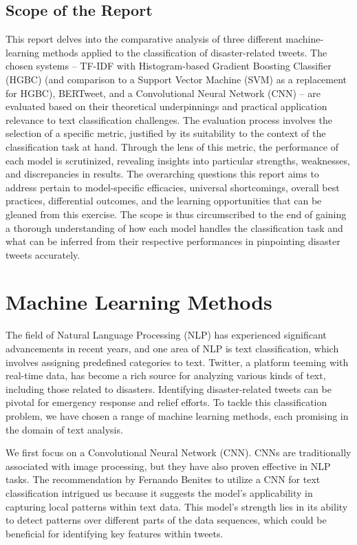 \documentclass[10pt,table]{article}
\begin{document}
\subsection{Scope of the Report}
This report delves into the comparative analysis of three different machine-learning methods applied to the classification of disaster-related tweets. The chosen systems – TF-IDF with Histogram-based Gradient Boosting Classifier (HGBC) (and comparison to a Support Vector Machine (SVM) as a replacement for HGBC), BERTweet, and a Convolutional Neural Network (CNN) – are evaluated based on their theoretical underpinnings and practical application relevance to text classification challenges. The evaluation process involves the selection of a specific metric, justified by its suitability to the context of the classification task at hand. Through the lens of this metric, the performance of each model is scrutinized, revealing insights into particular strengths, weaknesses, and discrepancies in results. The overarching questions this report aims to address pertain to model-specific efficacies, universal shortcomings, overall best practices, differential outcomes, and the learning opportunities that can be gleaned from this exercise. The scope is thus circumscribed to the end of gaining a thorough understanding of how each model handles the classification task and what can be inferred from their respective performances in pinpointing disaster tweets accurately.


\section{Machine Learning Methods}
The field of Natural Language Processing (NLP) has experienced significant advancements in recent years, and one area of NLP is text classification, which involves assigning predefined categories to text. Twitter, a platform teeming with real-time data, has become a rich source for analyzing various kinds of text, including those related to disasters. Identifying disaster-related tweets can be pivotal for emergency response and relief efforts. To tackle this classification problem, we have chosen a range of machine learning methods, each promising in the domain of text analysis.


We first focus on a Convolutional Neural Network (CNN). CNNs are traditionally associated with image processing, but they have also proven effective in NLP tasks. The recommendation by Fernando Benites to utilize a CNN for text classification intrigued us because it suggests the model's applicability in capturing local patterns within text data. This model's strength lies in its ability to detect patterns over different parts of the data sequences, which could be beneficial for identifying key features within tweets.
\end{document}
